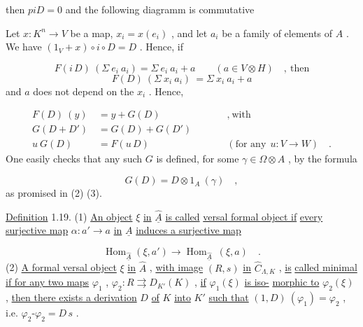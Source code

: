  then  $p i D = 0$  and the following diagramm is commutative

\begin{center}
\end{center}
Let  $x : K^{n} \rightarrow V$  be a map,  $x_{i} = x(e_{i})$  , and let  $a_{i}$  be a family of elements of  $A$  . We have  $(1_{V} + x) \circ i \circ D = D$  . Hence, if

\begin{equation*}
F(i\,D)\ (\Sigma\ e_{i}\ a_{i}) = \Sigma\ e_{i}\ a_{i} + a \qquad (a \in V \otimes H) \quad , \ \text{then}
\end{equation*}
\begin{equation*}
F(D)\ (\Sigma\ x_{i}\ a_{i}) \ = \Sigma\ x_{i}\ a_{i} + a
\end{equation*}
and  $a$  does not depend on the  $x_{i}$  . Hence,

\begin{equation*}
\begin{aligned}
F(D)\ (y) \ &= y + G(D) &&\qquad , \ \text{with} \\
G(D + D') &= G(D) + G(D') & \\
u\ G(D) \quad &= F(u\,D) &&\qquad (\text{for any} \ \ u : V \rightarrow W) \quad .
\end{aligned}
\end{equation*}
One easily checks that any such  $G$  is defined, for some  $\gamma \in \Omega \otimes A$  , by the formula

\begin{equation*}
G(D) = D \otimes 1_{A}\ (\gamma) \quad ,
\end{equation*}
as promised in (2) (3).

\underline{Definition} 1.19.   (1) \underline{An object}  $\xi$  \underline{in}  $\widehat{\underline{A}}$  \underline{is called}   \underline{versal formal object if} \underline{every surjective map}  $\alpha : a' \longrightarrow a$  \underline{in}  $\underline{A}$  \underline{induces a surjective map}

\begin{equation*}
\operatorname{Hom}_{\widehat{\underline{A}}}(\xi, a') \longrightarrow \operatorname{Hom}_{\widehat{\underline{A}}}\ (\xi, a) \quad .
\end{equation*}
(2)   \underline{A formal versal object}  $\xi$  \underline{in}  $\widehat{A}$  , \underline{with image}  $(R, s)$  \underline{in}  $\widehat{C}_{\Lambda,K}$  , \underline{is} \underline{called  minimal  if for any two maps}  $\varphi_{1}$ , $\varphi_{2} : R \rightrightarrows D_{K'}(K)$  , \underline{if}  $\varphi_{1}(\xi)$  \underline{is iso-} \underline{morphic to}  $\varphi_{2}(\xi)$  , \underline{then there exists a derivation}  $D$  \underline{of}  $K$  \underline{into}  $K'$  \underline{such that}  $(1, D)\ (\varphi_{1}) = \varphi_{2}$  , i.e.  $\varphi_{2}\text{-}\varphi_{2} = D\,s$  .


